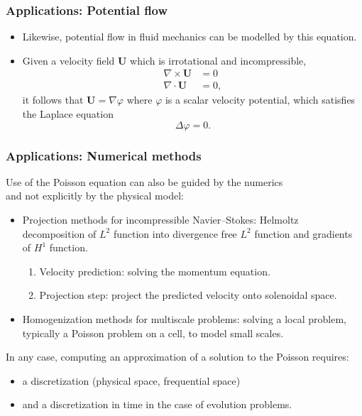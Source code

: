 \begin{frame}
  \frametitle{Applications: Potential flow}
  \begin{itemize}
  \item Likewise, potential flow in fluid mechanics can be modelled by this
    equation.
  \item Given a velocity field $\bm U$ which is irrotational and incompressible,
    \[
      \begin{split}
        \nabla \times \bm U &= 0 \\
        \nabla \cdot \bm U &= 0,
      \end{split}
    \]
    it follows that $\bm U = \nabla\varphi$ where $\varphi$ is a scalar velocity
    potential, which satisfies the Laplace equation
    \[
      \Delta\varphi = 0.
    \]
  \end{itemize}
\end{frame}

\begin{frame}
  \frametitle{Applications: Numerical methods}


Use of the Poisson equation can also be guided by the numerics \\and not explicitly by the physical model:
\begin{itemize}
\item Projection methods for incompressible Navier--Stokes: Helmoltz decomposition of $L^2$ function into divergence free $L^2$ function and gradients of $H^1$ function.
\begin{enumerate}
\item Velocity prediction: solving the momentum equation.
\item Projection step: project the predicted velocity onto solenoidal space.
\end{enumerate}

\bigskip
\item Homogenization methods for multiscale problems: solving a local problem, typically a Poisson problem on a cell, to model small scales.
\end{itemize}

\bigskip
In any case, computing an approximation of a solution to the Poisson requires:
\begin{itemize}
\item a discretization (physical space, frequential space) 
\item and a discretization in time in the case of evolution problems.
\end{itemize}

\end{frame}


